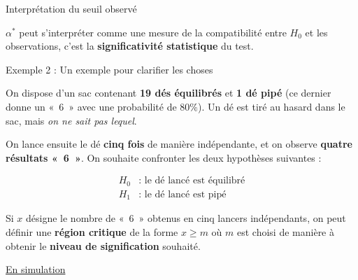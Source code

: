 \documentclass{BeamerTemplate}
\begin{document}




\begin{frame}[t]{Interprétation du seuil observé}

 $\alpha^*$ peut s'interpréter comme %
 \alert{une mesure de la compatibilité entre $H_0$ et les observations}, c'est la {\bf significativité statistique} du test.

\vspace{3mm}


\vspace{3mm}

\end{frame}

\begin{frame}[t]{Exemple 2 : Un exemple pour clarifier les choses}

{\small
On dispose d’un sac contenant \textbf{19 dés équilibrés} et \textbf{1 dé pipé} 
(ce dernier donne un «~6~» avec une probabilité de $80\%$). 
Un dé est tiré au hasard dans le sac, mais \textit{on ne sait pas lequel}. 

On lance ensuite le dé \textbf{cinq fois} de manière indépendante, et on observe 
\textbf{quatre résultats «~6~»}. 
On souhaite confronter les deux hypothèses suivantes :

\begin{align*}
    H_0 &: \text{ le dé lancé est équilibré}\\
    H_1 &: \text{ le dé lancé est pipé}
\end{align*}

Si $x$ désigne le nombre de «~6~» obtenus en cinq lancers indépendants, 
on peut définir une \textbf{région critique} de la forme $x \ge m$ où $m$ est choisi de manière à obtenir le \textbf{niveau de signification} souhaité.

\medskip
{}
}

\href{https://jmiron-exempledes.share.connect.posit.cloud/}{En simulation}
\end{frame}
\end{document}
